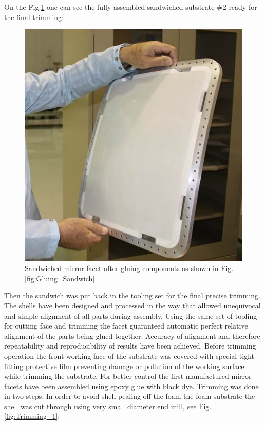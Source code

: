 On the Fig.\ref{fig:Assembled_Sandwich} one can see the fully assembled sandwiched substrate \#2 ready for the final trimming: 

\begin{figure}[ht]
    \centering
    \includegraphics[width=0.9\linewidth]{images/Assembled_Sandwich.jpg}
    \caption{Sandwiched mirror facet after gluing components as shown in Fig.\ref{fig:Gluing_Sandwich}}
    \label{fig:Assembled_Sandwich}
\end{figure}

Then the sandwich was put back in the tooling set for the final precise trimming. The shells have been designed and processed in the way that allowed  unequivocal and simple alignment of all parts during assembly. Using the same set of tooling for cutting face and trimming the facet guaranteed automatic perfect relative alignment of the parts being glued together. Accuracy of alignment and therefore repeatability and reproducibility of results have been achieved. Before trimming operation the front working face of the substrate was covered with special tight-fitting protective film preventing damage or pollution of the working surface while trimming the substrate. For better control the first manufactured mirror facets have been assembled using epoxy glue with black dye. Trimming was done in two steps. In order to avoid shell pealing off the foam the foam substrate the shell was cut through using very small diameter end mill, see Fig.\ref{fig:Trimming_1}:

